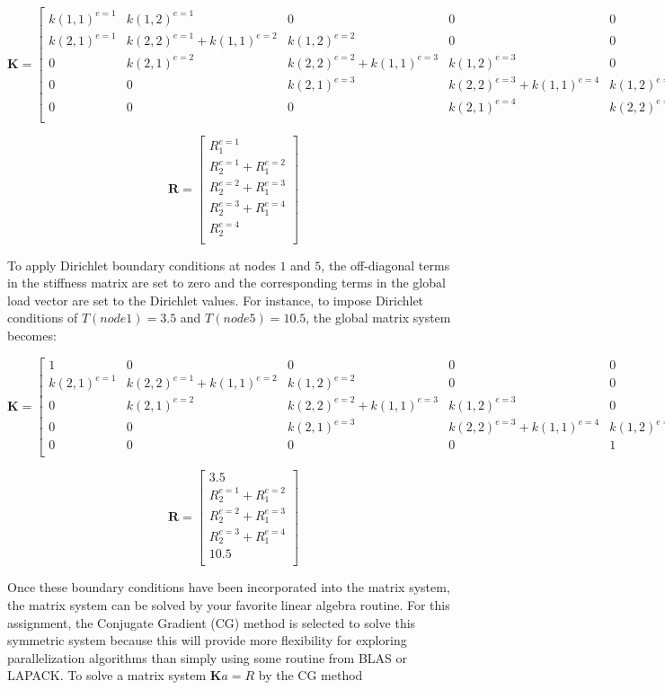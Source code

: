 \documentclass[10pt]{article}
\newcommand{\beq}{\begin{equation}}
\newcommand{\eeq}{\end{equation}}
\begin{document}
\beq
\textbf{K}=
\begin{bmatrix}
k(1, 1)^{e=1} & k(1, 2)^{e=1} & 0 & 0 & 0\\
k(2, 1)^{e=1} & k(2, 2)^{e=1}+k(1, 1)^{e=2} & k(1, 2)^{e=2} & 0 & 0\\
0 & k(2, 1)^{e=2} & k(2, 2)^{e=2}+k(1, 1)^{e=3} & k(1, 2)^{e=3} & 0\\
0 & 0 & k(2, 1)^{e=3} & k(2, 2)^{e=3}+k(1, 1)^{e=4} & k(1, 2)^{e=4}\\
0 & 0 & 0 & k(2, 1)^{e=4} & k(2, 2)^{e=4}\\
\end{bmatrix}
\eeq

\beq
\textbf{R}=\begin{bmatrix}
R_1^{e=1} \\ R_2^{e=1}+R_1^{e=2}\\R_2^{e=2}+R_1^{e=3}\\R_2^{e=3}+R_1^{e=4}\\R_2^{e=4}\\
\end{bmatrix}
\eeq

To apply Dirichlet boundary conditions at nodes \(1\) and \(5\), the off-diagonal terms in the stiffness matrix are set to zero and the corresponding terms in the global load vector are set to the Dirichlet values. For instance, to impose Dirichlet conditions of \(T(node 1)=3.5\) and \(T(node 5) = 10.5\), the global matrix system becomes:

\beq
\textbf{K}=
\begin{bmatrix}
1 & 0 & 0 & 0 & 0\\
k(2, 1)^{e=1} & k(2, 2)^{e=1}+k(1, 1)^{e=2} & k(1, 2)^{e=2} & 0 & 0\\
0 & k(2, 1)^{e=2} & k(2, 2)^{e=2}+k(1, 1)^{e=3} & k(1, 2)^{e=3} & 0\\
0 & 0 & k(2, 1)^{e=3} & k(2, 2)^{e=3}+k(1, 1)^{e=4} & k(1, 2)^{e=4}\\
0 & 0 & 0 & 0 & 1\\
\end{bmatrix}
\eeq

\beq
\textbf{R}=\begin{bmatrix}
3.5\\ R_2^{e=1}+R_1^{e=2}\\R_2^{e=2}+R_1^{e=3}\\R_2^{e=3}+R_1^{e=4}\\10.5\\
\end{bmatrix}
\eeq

Once these boundary conditions have been incorporated into the matrix system, the matrix system can be solved by your favorite linear algebra routine. For this assignment, the Conjugate Gradient (CG) method is selected to solve this symmetric system because this will provide more flexibility for exploring parallelization algorithms than simply using some routine from BLAS or LAPACK. To solve a matrix system \(\textbf{K}a=R\) by the CG method 
\end{document}
